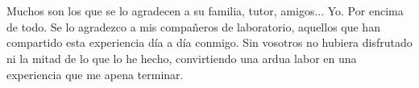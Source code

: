 \chapter*{\seccionagradecimiento}
\markboth{\seccionagradecimiento}{\seccionagradecimiento}

Muchos son los que se lo agradecen a su familia, tutor, amigos... Yo. Por encima de todo. Se lo agradezco a mis compañeros de laboratorio, aquellos que han compartido esta experiencia día a día conmigo. Sin vosotros no hubiera disfrutado ni la mitad de lo que lo he hecho, convirtiendo una ardua labor en una experiencia que me apena terminar.



\clearpage
\thispagestyle{empty}
\hfill
\clearpage